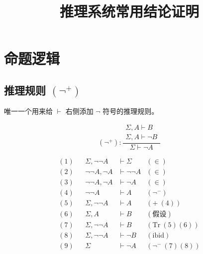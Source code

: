\documentclass[UTF8]{ctexart}
\title{\vspace{-4em} 推理系统常用结论证明 \vspace{-2em} }
\begin{document}
    \maketitle

    \setlength{\abovedisplayskip}{0pt}
    \setlength{\belowdisplayskip}{0pt}
    
    \section{命题逻辑 \vspace{-3pt}}

    \subsection*{推理规则 $(\lnot^{+})$ \vspace{-3pt}}
    唯一一个用来给 $\vdash$ 右侧添加 $\lnot$ 符号的推理规则。

    \begin{equation*}
        (\lnot^{+}): \dfrac{\begin{matrix}\Sigma, A \vdash B \\ \Sigma, A \vdash \lnot B \end{matrix}}{\Sigma \vdash \lnot A}
    \end{equation*}

    \begin{align*}
        (1) && \Sigma, \lnot \lnot A & \vdash \Sigma & (\in) \\
        (2) && \lnot \lnot A, \lnot A & \vdash \lnot \lnot A & (\in) \\
        (3) && \lnot \lnot A, \lnot A & \vdash \lnot A & (\in) \\
        (4) && \lnot \lnot A & \vdash A & (\lnot^{-}) \\
        (5) && \Sigma, \lnot \lnot A & \vdash A & (+\ (4)) \\
        (6) && \Sigma, A & \vdash B & (\text{假设}) \\
        (7) && \Sigma, \lnot \lnot A & \vdash B & (\mathrm{Tr}\ (5)(6)) \\
        (8) && \Sigma, \lnot \lnot A & \vdash \lnot B & (\mathrm{ibid}) \\
        (9) && \Sigma & \vdash \lnot A & (\lnot^{-}\ (7)(8))
    \end{align*}

\end{document}
